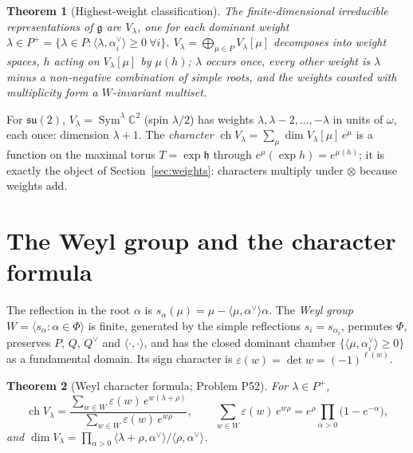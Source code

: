 \documentclass[11pt]{article}
\newtheorem{theorem}{Theorem}[section]
\theoremstyle{definition}
\theoremstyle{remark}
\newcommand{\C}{\mathbb{C}}
\begin{document}
\begin{theorem}[Highest-weight classification]\label{thm:highest}
The finite-dimensional irreducible representations of $\mathfrak g$ are
$V_\lambda$, one for each dominant weight
$\lambda\in P^+ = \{\lambda\in P : \langle\lambda,\alpha_i^\vee\rangle\ge0\ \forall i\}$.
$V_\lambda = \bigoplus_{\mu\in P}V_\lambda[\mu]$ decomposes into weight
spaces, $h$ acting on $V_\lambda[\mu]$ by $\mu(h)$; $\lambda$ occurs once,
every other weight is $\lambda$ minus a non-negative combination of simple
roots, and the weights counted with multiplicity form a $W$-invariant
multiset.
\end{theorem}

For $\mathfrak{su}(2)$, $V_\lambda = \operatorname{Sym}^\lambda\C^2$ (spin
$\lambda/2$) has weights $\lambda,\lambda-2,\dots,-\lambda$ in units of
$\omega$, each once: dimension $\lambda+1$. The \emph{character}
$\operatorname{ch}V_\lambda = \sum_\mu\dim V_\lambda[\mu]\,e^{\mu}$ is a
function on the maximal torus $T = \exp\mathfrak h$ through
$e^{\mu}(\exp h) = e^{\mu(h)}$; it is exactly the object of
Section~\ref{sec:weights}: characters multiply under $\otimes$ because
weights add.

\section{The Weyl group and the character formula}\label{sec:weyl}

The reflection in the root $\alpha$ is
$s_\alpha(\mu) = \mu-\langle\mu,\alpha^\vee\rangle\alpha$. The \emph{Weyl
group} $W = \langle s_\alpha:\alpha\in\Phi\rangle$ is finite, generated by
the simple reflections $s_i = s_{\alpha_i}$, permutes $\Phi$, preserves
$P$, $Q$, $Q^\vee$ and $\langle\cdot,\cdot\rangle$, and has the closed
dominant chamber $\{\langle\mu,\alpha_i^\vee\rangle\ge0\}$ as a
fundamental domain. Its sign character is
$\varepsilon(w) = \det w = (-1)^{\ell(w)}$.

\begin{theorem}[Weyl character formula; Problem P52]\label{thm:weylchar}
For $\lambda\in P^+$,
\[
  \operatorname{ch}V_\lambda = \frac{\sum_{w\in W}\varepsilon(w)\,e^{w(\lambda+\rho)}}
                                    {\sum_{w\in W}\varepsilon(w)\,e^{w\rho}},
  \qquad
  \sum_{w\in W}\varepsilon(w)\,e^{w\rho} = e^{\rho}\prod_{\alpha>0}\big(1-e^{-\alpha}\big),
\]
and $\dim V_\lambda = \prod_{\alpha>0}\langle\lambda+\rho,\alpha^\vee\rangle/\langle\rho,\alpha^\vee\rangle$.
\end{theorem}
\end{document}
